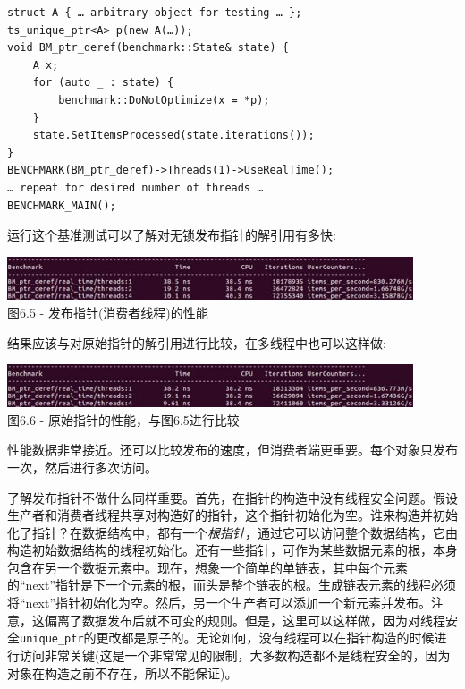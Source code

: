 \begin{lstlisting}[style=styleCXX]
struct A { … arbitrary object for testing … };
ts_unique_ptr<A> p(new A(…));
void BM_ptr_deref(benchmark::State& state) {
	A x;
	for (auto _ : state) {
		benchmark::DoNotOptimize(x = *p);
	}
	state.SetItemsProcessed(state.iterations());
}
BENCHMARK(BM_ptr_deref)->Threads(1)->UseRealTime();
… repeat for desired number of threads …
BENCHMARK_MAIN();
\end{lstlisting}

运行这个基准测试可以了解对无锁发布指针的解引用有多快:

\begin{center}
\includegraphics[width=0.9\textwidth]{content/2/chapter6/images/5.jpg}\\
图6.5 - 发布指针(消费者线程)的性能
\end{center}

结果应该与对原始指针的解引用进行比较，在多线程中也可以这样做:

\begin{center}
\includegraphics[width=0.9\textwidth]{content/2/chapter6/images/6.jpg}\\
图6.6 - 原始指针的性能，与图6.5进行比较
\end{center}

性能数据非常接近。还可以比较发布的速度，但消费者端更重要。每个对象只发布一次，然后进行多次访问。

了解发布指针不做什么同样重要。首先，在指针的构造中没有线程安全问题。假设生产者和消费者线程共享对构造好的指针，这个指针初始化为空。谁来构造并初始化了指针？在数据结构中，都有一个\textit{根指针}，通过它可以访问整个数据结构，它由构造初始数据结构的线程初始化。还有一些指针，可作为某些数据元素的根，本身包含在另一个数据元素中。现在，想象一个简单的单链表，其中每个元素的“next”指针是下一个元素的根，而头是整个链表的根。生成链表元素的线程必须将“next”指针初始化为空。然后，另一个生产者可以添加一个新元素并发布。注意，这偏离了数据发布后就不可变的规则。但是，这里可以这样做，因为对线程安全\texttt{unique\_ptr}的更改都是原子的。无论如何，没有线程可以在指针构造的时候进行访问非常关键(这是一个非常常见的限制，大多数构造都不是线程安全的，因为对象在构造之前不存在，所以不能保证)。

